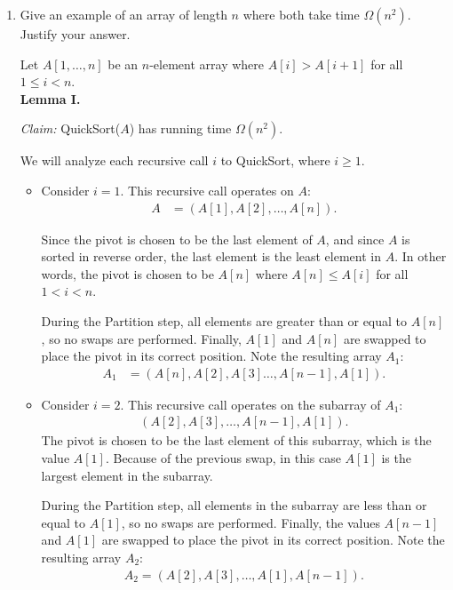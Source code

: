 \begin{enumerate}
    \item Give an example of an array of length $n$ where both take time $\Omega(n^2)$. Justify your answer.  
\begin{solution}
Let $A[1,\dots,n]$ be an $n$-element array where $A[i]>A[i+1]$ for all $1\leq i<n$.\\

\textbf{Lemma I. }

\textit{Claim: }{\sc QuickSort}($A$) has running time $\Omega(n^2)$.

We will analyze each recursive call $i$ to {\sc QuickSort}, where $i\geq 1$.
\begin{itemize}
\item Consider $i=1$. This recursive call operates on $A$:
\begin{align*}
A&=(A[1],A[2],\dots,A[n]).
\end{align*}

Since the pivot is chosen to be the last element of $A$, and since $A$ is sorted in reverse order, the last element is the least element in $A$. In other words, the pivot is chosen to be $A[n]$ where $A[n]\leq A[i]$ for all $1<i<n$.

During the {\sc Partition} step, all elements are greater than or equal to $A[n]$, so no swaps are performed. Finally, $A[1]$ and $A[n]$ are swapped to place the pivot in its correct position. Note the resulting array $A_1$:
\begin{align*}
A_1&=(A[n],A[2],A[3]\dots,A[n-1],A[1]).
\end{align*}

\item Consider $i=2$. This recursive call operates on the subarray of $A_1$:
\begin{align*}
(A[2],A[3],\dots,A[n-1],A[1]).
\end{align*}
The pivot is chosen to be the last element of this subarray, which is the value $A[1]$. Because of the previous swap, in this case $A[1]$ is the largest element in the subarray. 

During the {\sc Partition} step, all elements in the subarray are less than or equal to $A[1]$, so no swaps are performed. Finally, the values $A[n-1]$ and $A[1]$ are swapped to place the pivot in its correct position. Note the resulting array $A_2$:
\begin{align*}
A_2=(A[2],A[3],\dots,A[1],A[n-1]).
\end{align*}
\end{itemize}


\end{solution}
\end{enumerate}
